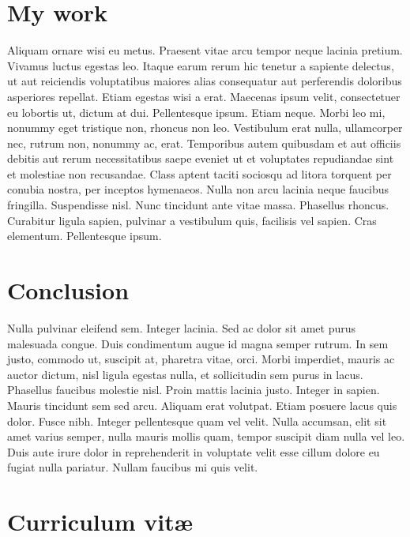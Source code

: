 \documentclass[%
  14pt,       				%
  a4paper,    				%
	twoside,      			%
	unicode,						%
]{extreport}				  %
\begin{document}
\chapter{My work}
Aliquam ornare wisi eu metus. Praesent vitae arcu tempor neque lacinia pretium. Vivamus luctus egestas leo. Itaque earum rerum hic tenetur a sapiente delectus, ut aut reiciendis voluptatibus maiores alias consequatur aut perferendis doloribus asperiores repellat. Etiam egestas wisi a erat. Maecenas ipsum velit, consectetuer eu lobortis ut, dictum at dui. Pellentesque ipsum. Etiam neque. Morbi leo mi, nonummy eget tristique non, rhoncus non leo. Vestibulum erat nulla, ullamcorper nec, rutrum non, nonummy ac, erat. Temporibus autem quibusdam et aut officiis debitis aut rerum necessitatibus saepe eveniet ut et voluptates repudiandae sint et molestiae non recusandae. Class aptent taciti sociosqu ad litora torquent per conubia nostra, per inceptos hymenaeos. Nulla non arcu lacinia neque faucibus fringilla. Suspendisse nisl. Nunc tincidunt ante vitae massa. Phasellus rhoncus. Curabitur ligula sapien, pulvinar a vestibulum quis, facilisis vel sapien. Cras elementum. Pellentesque ipsum.

\chapter{Conclusion}
Nulla pulvinar eleifend sem. Integer lacinia. Sed ac dolor sit amet purus malesuada congue. Duis condimentum augue id magna semper rutrum. In sem justo, commodo ut, suscipit at, pharetra vitae, orci. Morbi imperdiet, mauris ac auctor dictum, nisl ligula egestas nulla, et sollicitudin sem purus in lacus. Phasellus faucibus molestie nisl. Proin mattis lacinia justo. Integer in sapien. Mauris tincidunt sem sed arcu. Aliquam erat volutpat. Etiam posuere lacus quis dolor. Fusce nibh. Integer pellentesque quam vel velit. Nulla accumsan, elit sit amet varius semper, nulla mauris mollis quam, tempor suscipit diam nulla vel leo. Duis aute irure dolor in reprehenderit in voluptate velit esse cillum dolore eu fugiat nulla pariatur. Nullam faucibus mi quis velit.

%



\newpage
\chapter*{Curriculum vitæ}
{}
\end{document}
